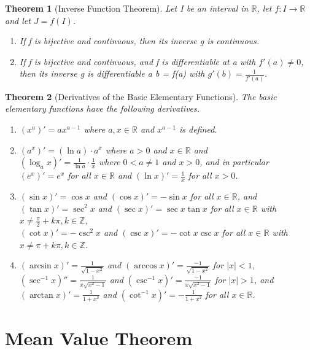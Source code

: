 \documentclass[11pt, oneside]{book}
\theoremstyle{break}
\newtheorem{thm}{Theorem}[section]
\newcommand{\bb}[1]{\mathbb{#1}}		%
\begin{document}
\begin{thm}[Inverse Function Theorem]
	Let I be an interval in $\bb{R}$, let $f: I \to \bb{R}$ and let $J = f(I)$.
	\begin{enumerate}
		\item If f is bijective and continuous, then its inverse g is continuous.
		\item If f is bijective and continuous, and f is differentiable at a with $f'(a) \neq 0$, then its inverse g is differentiable a b = f(a) with $g'(b) = \frac{1}{f'(a)}$.
	\end{enumerate}
\end{thm}

\begin{thm}[Derivatives of the Basic Elementary Functions]
	The basic elementary functions have the following derivatives.
	\begin{enumerate}
		\item $(x^a)' = a x^{a-1}$ where $a, x \in \bb{R}$ and $x^{a - 1}$ is defined.
		\item $(a^x)' = (\ln a) \cdot a^x$ where $a > 0$ and $x \in \bb{R}$ and \\
		 	  $(\log_a x)' = \frac{1}{\ln a} \cdot \frac{1}{x}$ where $0 < a \neq 1$ and $x > 0$, and in particular \\
		 	  $(e^x)' = e^x$ for all $x \in \bb{R}$ and $(\ln x)' = \frac{1}{x}$ for all $x > 0$.
		\item $(\sin x)' = \cos x$ and $(\cos x)' = -\sin x$ for all $x \in \bb{R}$, and \\
			  $(\tan x)' = \sec^2 x$ and $(\sec x)' = \sec x \tan x$ for all $x \in \bb{R}$ with $x \neq \frac{\pi}{2} + k\pi, k \in \bb{Z}$,\\
			  $(\cot x)' = -\csc^2 x$ and $(\csc x)' = -\cot x \csc x$ for all $x \in \bb{R}$ with $x \neq \pi + k \pi, k \in \bb{Z}$.
		\item $(\arcsin x)' = \frac{1}{\sqrt{1 - x^2}}$ and $(\arccos x)' = \frac{-1}{\sqrt{1 - x^2}}$ for $|x| < 1$, \\
			  $(\sec^{-1} x)'' = \frac{1}{x \sqrt{x^2 - 1}}$ and $(\csc^{-1} x)' = \frac{-1}{x \sqrt{x^2 - 1}}$ for $|x| > 1$, and \\
			  $(\arctan x)' = \frac{1}{1 + x^2}$ and $(\cot^{-1} x)' = -\frac{1}{1 + x^2}$ for all $x \in \bb{R}$.
	\end{enumerate}
\end{thm}


\section{Mean Value Theorem}
\end{document}

